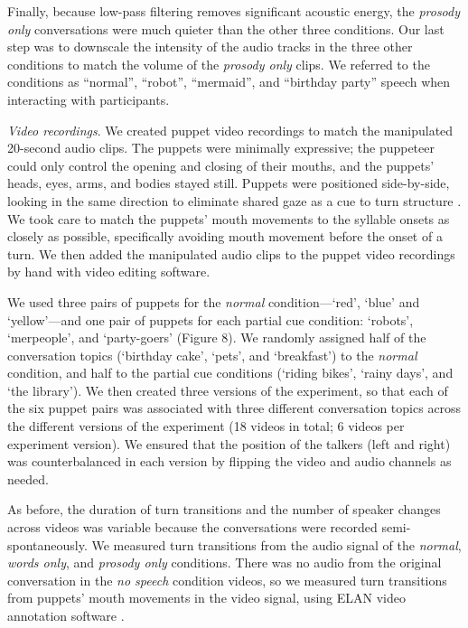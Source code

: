 \documentclass[authoryear, 12pt]{elsarticle}
\begin{document}
Finally, because low-pass filtering removes significant acoustic energy, the \textit{prosody only} conversations were much quieter than the other three conditions. Our last step was to downscale the intensity of the audio tracks in the three other conditions to match the volume of the \textit{prosody only} clips. We referred to the conditions as ``normal'', ``robot'', ``mermaid'', and ``birthday party'' speech when interacting with participants.

\textit{Video recordings}. We created puppet video recordings to match the manipulated 20-second audio clips. The puppets were minimally expressive; the puppeteer could only control the opening and closing of their mouths, and the puppets' heads, eyes, arms, and bodies stayed still. Puppets were positioned side-by-side, looking in the same direction to eliminate shared gaze as a cue to turn structure \citep{thorgrimsson2015}. We took care to match the puppets' mouth movements to the syllable onsets as closely as possible, specifically avoiding mouth movement before the onset of a turn. We then added the manipulated audio clips to the puppet video recordings by hand with video editing software.

We used three pairs of puppets for the \textit{normal} condition---`red', `blue' and `yellow'---and one pair of puppets for each partial cue condition: `robots', `merpeople', and `party-goers' (Figure 8). We randomly assigned half of the conversation topics (`birthday cake', `pets', and `breakfast') to the \textit{normal} condition, and half to the partial cue conditions (`riding bikes', `rainy days', and `the library'). We then created three versions of the experiment, so that each of the six puppet pairs was associated with three different conversation topics across the different versions of the experiment (18 videos in total; 6 videos per experiment version). We ensured that the position of the talkers (left and right) was counterbalanced in each version by flipping the video and audio channels as needed.

As before, the duration of turn transitions and the number of speaker changes across videos was variable because the conversations were recorded semi-spontaneously. We measured turn transitions from the audio signal of the \textit{normal}, \textit{words only}, and \textit{prosody only} conditions. There was no audio from the original conversation in the \textit{no speech} condition videos, so we measured turn transitions from puppets' mouth movements in the video signal, using ELAN video annotation software \citep{ELAN}.
\end{document}
